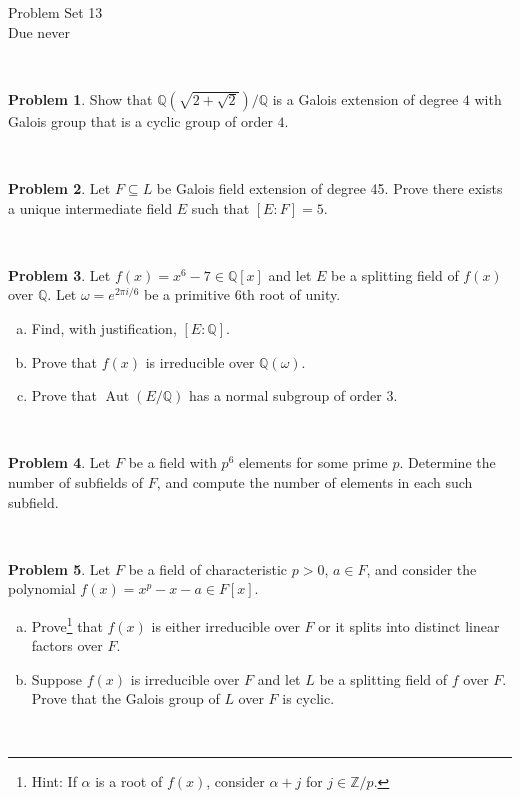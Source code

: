 \documentclass[11pt]{article}
\title{}
\date{\vspace{-0.5in}}
\DeclareMathOperator{\Aut}{Aut}
\newcommand{\Q}{\mathbb{Q}}
\newcommand{\Z}{\mathbb{Z}}
\theoremstyle{definition}
\newtheorem{problem}{Problem}
\begin{document}
\thispagestyle{fancy}
\pagestyle{fancy}

\vspace{3em}

\begin{center}
	{\LARGE Problem Set 13 \\}
	Due never\end{center}

\




\begin{problem}
Show that $\Q(\sqrt{2+\sqrt{2}})/\Q$ is a Galois extension of degree $4$ with Galois group that is a cyclic group of order $4$.	
\end{problem}

\


\begin{problem}
	Let $F \subseteq L$ be Galois field extension of degree 45. Prove there exists a unique intermediate field $E$ such that $[E : F] = 5$.
\end{problem}

\



\begin{problem} Let $f(x)=x^6-7\in \Q[x]$ and let $E$ be a splitting field of $f(x)$ over $\Q$.
Let $\omega=e^{2\pi i/6}$ be a primitive $6$th root of unity.
\begin{enumerate}[(a)]
\item Find, with justification, $[E:\Q]$.
\item Prove that $f(x)$ is irreducible over $\Q(\omega)$.
\item Prove that $\Aut(E/\Q)$ has a normal subgroup of order $3$.
\end{enumerate}
\end{problem}


\


\begin{problem}
Let $F$ be a field with $p^6$ elements for some prime $p$. Determine the number of subfields of $F$, and compute the number of elements in each such subfield.
\end{problem} 

\

\begin{problem} Let $F$ be a field of characteristic $p > 0$, $a \in F$, and consider the polynomial $f(x)=x^p -x-a \in F[x]$.

  \begin{enumerate}[(a)]

    \item Prove\footnote{Hint: If $\alpha$ is a root of
      $f(x)$,  consider $\alpha + j$ for $j \in \Z/p$.} that $f(x)$ is either irreducible over $F$ or it splits
      into distinct linear factors over $F$.

      \item Suppose $f(x)$ is irreducible over $F$ and let $L$ be a
        splitting field of $f$ over $F$.  Prove that the Galois group of $L$ over $F$ is cyclic.

\end{enumerate}
\end{problem} 

\
\end{document}
